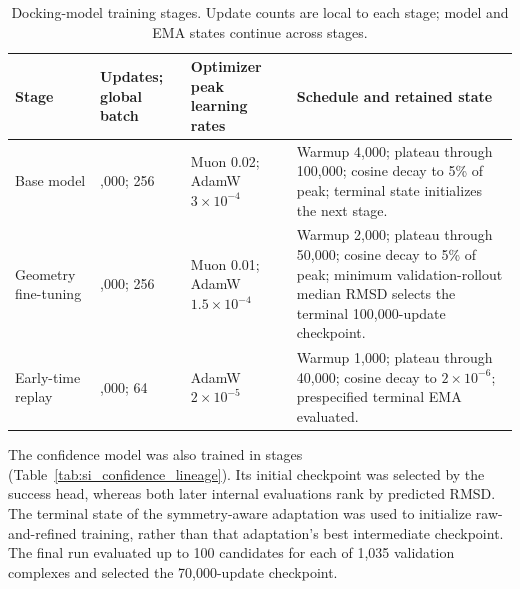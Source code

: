 \documentclass{article}
\begin{document}
\begin{table}[htbp]
    \centering
    \small
    \caption{Docking-model training stages. Update counts are local to each stage; model and EMA states continue across stages.}
    \label{tab:si_docking_lineage}
    \begin{tabularx}{\textwidth}{@{}>{\raggedright\arraybackslash}p{}>{\raggedright\arraybackslash}p{}>{\raggedright\arraybackslash}p{}>{\raggedright\arraybackslash}X@{}}
        \toprule
        Stage & Updates; global batch & Optimizer peak learning rates & Schedule and retained state \\
        \midrule
        Base model & 200,000; 256 & Muon 0.02; AdamW \(3\times10^{-4}\) & Warmup 4,000; plateau through 100,000; cosine decay to 5\% of peak; terminal state initializes the next stage. \\
        Geometry fine-tuning & 100,000; 256 & Muon 0.01; AdamW \(1.5\times10^{-4}\) & Warmup 2,000; plateau through 50,000; cosine decay to 5\% of peak; minimum validation-rollout median RMSD selects the terminal 100,000-update checkpoint. \\
        Early-time replay & 50,000; 64 & AdamW \(2\times10^{-5}\) & Warmup 1,000; plateau through 40,000; cosine decay to \(2\times10^{-6}\); prespecified terminal EMA evaluated. \\
        \bottomrule
    \end{tabularx}
\end{table}

The confidence model was also trained in stages (Table~\ref{tab:si_confidence_lineage}). Its initial checkpoint was selected by the success head, whereas both later internal evaluations rank by predicted RMSD. The terminal state of the symmetry-aware adaptation was used to initialize raw-and-refined training, rather than that adaptation's best intermediate checkpoint. The final run evaluated up to 100 candidates for each of 1,035 validation complexes and selected the 70,000-update checkpoint.
\end{document}
